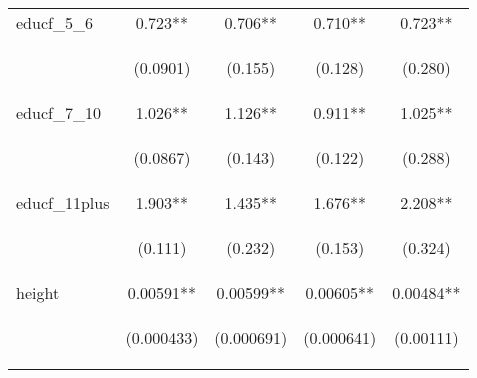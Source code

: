 \documentclass[]{article}
\begin{document}
\begin{center}
\begin{tabular}{lcccc}
educf\_5\_6 & 0.723** & 0.706** & 0.710** & 0.723** \\
\vspace{4pt} & \begin{footnotesize}(0.0901)\end{footnotesize} & \begin{footnotesize}(0.155)\end{footnotesize} & \begin{footnotesize}(0.128)\end{footnotesize} & \begin{footnotesize}(0.280)\end{footnotesize} \\
educf\_7\_10 & 1.026** & 1.126** & 0.911** & 1.025** \\
\vspace{4pt} & \begin{footnotesize}(0.0867)\end{footnotesize} & \begin{footnotesize}(0.143)\end{footnotesize} & \begin{footnotesize}(0.122)\end{footnotesize} & \begin{footnotesize}(0.288)\end{footnotesize} \\
educf\_11plus & 1.903** & 1.435** & 1.676** & 2.208** \\
\vspace{4pt} & \begin{footnotesize}(0.111)\end{footnotesize} & \begin{footnotesize}(0.232)\end{footnotesize} & \begin{footnotesize}(0.153)\end{footnotesize} & \begin{footnotesize}(0.324)\end{footnotesize} \\
height & 0.00591** & 0.00599** & 0.00605** & 0.00484** \\
\vspace{4pt} & \begin{footnotesize}(0.000433)\end{footnotesize} & \begin{footnotesize}(0.000691)\end{footnotesize} & \begin{footnotesize}(0.000641)\end{footnotesize} & \begin{footnotesize}(0.00111)\end{footnotesize} \\

\end{tabular}
\end{center}
\end{document}
